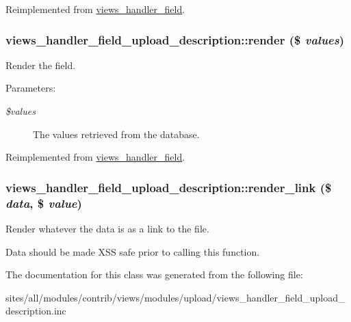 Reimplemented from \hyperlink{classviews__handler__field_e30a1d9c98c62ae40c90b938e09cd0ec}{views\_\-handler\_\-field}.\hypertarget{classviews__handler__field__upload__description_373489ebca619b9f73ebfd3441a1cd19}{
\subsubsection[{render}]{\setlength{\rightskip}{0pt plus 5cm}views\_\-handler\_\-field\_\-upload\_\-description::render (\$ {\em values})}}
\label{classviews__handler__field__upload__description_373489ebca619b9f73ebfd3441a1cd19}


Render the field.

\begin{Desc}
\item[Parameters:]
\begin{description}
\item[{\em \$values}]The values retrieved from the database. \end{description}
\end{Desc}


Reimplemented from \hyperlink{classviews__handler__field_82ff951c5e9ceb97b2eab86f880cbc1e}{views\_\-handler\_\-field}.\hypertarget{classviews__handler__field__upload__description_2abc8e79bc269c87dda32ad9f70f7ae4}{
\subsubsection[{render\_\-link}]{\setlength{\rightskip}{0pt plus 5cm}views\_\-handler\_\-field\_\-upload\_\-description::render\_\-link (\$ {\em data}, \/  \$ {\em value})}}
\label{classviews__handler__field__upload__description_2abc8e79bc269c87dda32ad9f70f7ae4}


Render whatever the data is as a link to the file.

Data should be made XSS safe prior to calling this function. 

The documentation for this class was generated from the following file:\begin{CompactItemize}
\item 
sites/all/modules/contrib/views/modules/upload/views\_\-handler\_\-field\_\-upload\_\-description.inc\end{CompactItemize}
